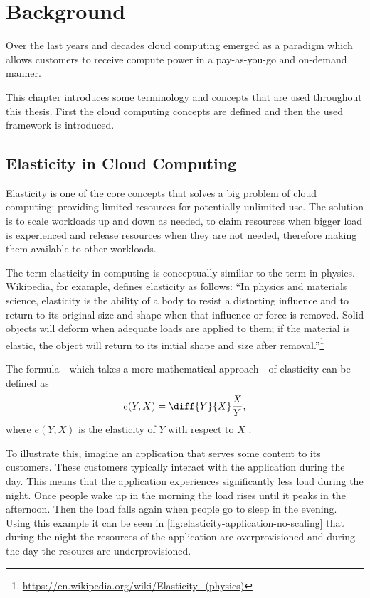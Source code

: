 \chapter{Background}
\label{ch:background}

Over the last years and decades cloud computing emerged as a paradigm which allows customers to receive compute power in a pay-as-you-go and on-demand manner.

This chapter introduces some terminology and concepts that are used throughout this thesis. First the cloud computing concepts are defined and then the used framework is introduced.

\section{Elasticity in Cloud Computing}
\label{sec:elasticity}

Elasticity is one of the core concepts that solves a big problem of cloud computing: providing limited resources for potentially unlimited use. The solution is to scale workloads up and down as needed, to claim resources when bigger load is experienced and release resources when they are not needed, therefore making them available to other workloads.

The term elasticity in computing is conceptually similiar to the term in physics. Wikipedia, for example, defines elasticity as follows: ``In physics and materials science, elasticity is the ability of a body to resist a distorting influence and to return to its original size and shape when that influence or force is removed. Solid objects will deform when adequate loads are applied to them; if the material is elastic, the object will return to its initial shape and size after removal.''\footnote{\url{https://en.wikipedia.org/wiki/Elasticity_(physics)}}

The formula - which takes a more mathematical approach - of elasticity can be defined as \[ e(Y, X) = \diff{Y}{X} \frac{X}{Y}, \] where \(e(Y, X)\) is the elasticity of \(Y\) with respect to \(X\) \cite{dustdarPrinciplesElasticProcesses2011}.

To illustrate this, imagine an application that serves some content to its customers. These customers typically interact with the application during the day. This means that the application experiences significantly less load during the night. Once people wake up in the morning the load rises until it peaks in the afternoon. Then the load falls again when people go to sleep in the evening. Using this example it can be seen in \cref{fig:elasticity-application-no-scaling} that during the night the resources of the application are overprovisioned and during the day the resoures are underprovisioned.

